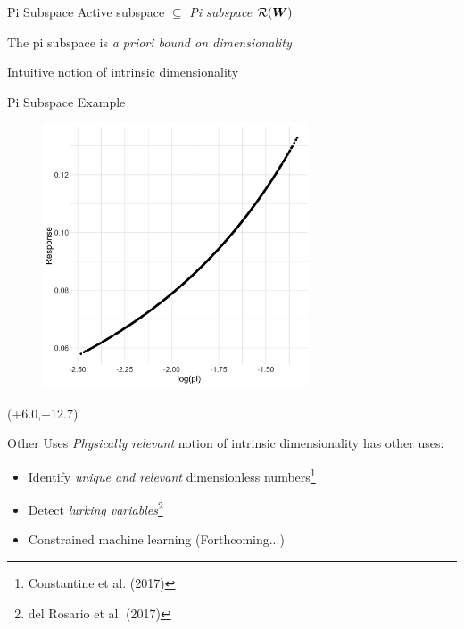 \documentclass[14pt]{beamer}
\begin{document}
\begin{frame}{Pi Subspace}
  Active subspace $\subseteq$ \emph{Pi subspace} $\mathcal{R}(\boldsymbol{W})$

  \bigskip The pi subspace is \emph{a priori bound on dimensionality}

  \bigskip Intuitive notion of intrinsic dimensionality
\end{frame}

\begin{frame}{Pi Subspace Example}
  \begin{figure}
    \centering
    \includegraphics[width=0.7\textwidth]{../images/as_summary_pi}
  \end{figure}

  \begin{textblock}{7}(+6.0,+12.7)
  \end{textblock}
\end{frame}

\begin{frame}{Other Uses}
  \emph{Physically relevant} notion of intrinsic dimensionality has other uses:

  \begin{itemize}
  \item Identify \emph{unique and relevant} dimensionless numbers\footnote{Constantine et al. (2017)}
  \item Detect \emph{lurking variables}\footnote{del Rosario et al. (2017)}
  \item Constrained machine learning (Forthcoming...)
  \end{itemize}
\end{frame}
\end{document}

